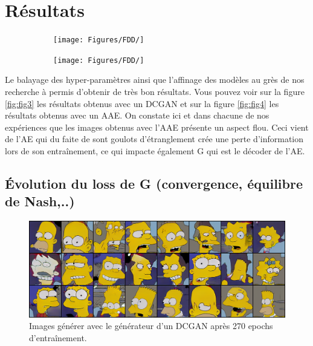 \documentclass[11pt,francais]{article}
\begin{document}
\section{Résultats}

\begin{figure}[!h]
    \centering
    \begin{subfigure}[b]{0.20\textwidth}
        \texttt{[image: Figures/FDD/]}
    \end{subfigure}
    \begin{subfigure}[b]{0.20\textwidth}
        \texttt{[image: Figures/FDD/]}
    \end{subfigure}
    \caption{}
    \label{fig:fig5}
\end{figure}

Le balayage des hyper-paramètres ainsi que l'affinage des modèles au grès de nos recherche à permis d'obtenir de très bon résultats. Vous pouvez voir sur la figure \ref{fig:fig3} les résultats obtenus avec un DCGAN et sur la figure \ref{fig:fig4} les résultats obtenus avec un AAE.
On constate ici et dans chacune de nos expériences que les images obtenus avec l'AAE présente un aspect flou. Ceci vient de l'AE qui du faite de sont goulots d'étranglement crée une perte d'information lors de son entraînement, ce qui impacte également G qui est le décoder de l'AE.

\subsection{Évolution du loss de G (convergence, équilibre de Nash,..)}
\label{sec:LossG_et_Convergeance}

\begin{figure}[!h]
    \centering
    \includegraphics[width=\textwidth]{Figures/resultats_simpsons/DCGAN_270.png}
    \caption{Images générer avec le générateur d'un DCGAN après 270 epochs d'entraînement.}
    \label{fig:fig5}
\end{figure}
\end{document}
